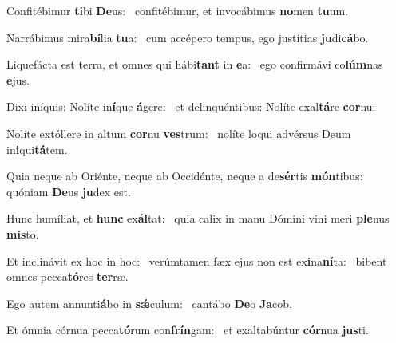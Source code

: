 \item Confitébimur \textbf{ti}bi \textbf{De}us:~\psstar{} confitébimur, et invocábimus \textbf{no}men \textbf{tu}um.
\item Narrábimus mira\textbf{bí}lia \textbf{tu}a:~\psstar{} cum accépero tempus, ego justítias \textbf{ju}di\textbf{cá}bo.
\item Liquefácta est terra, et omnes qui hábi\textbf{tant} in \textbf{e}a:~\psstar{} ego confirmávi co\textbf{lúm}nas \textbf{e}jus.
\item Dixi iníquis: Nolíte in\textbf{í}que \textbf{á}gere:~\psstar{} et delinquéntibus: Nolíte exal\textbf{tá}re \textbf{cor}nu:
\item Nolíte extóllere in altum \textbf{cor}nu \textbf{ves}trum:~\psstar{} nolíte loqui advérsus Deum in\textbf{i}qui\textbf{tá}tem.
\item Quia neque ab Oriénte, neque ab Occidénte, neque a de\textbf{sér}tis \textbf{món}tibus:~\psstar{} quóniam \textbf{De}us \textbf{ju}dex est.
\item Hunc humíliat, et \textbf{hunc} ex\textbf{ál}tat:~\psstar{} quia calix in manu Dómini vini meri \textbf{ple}nus \textbf{mis}to.
\item Et inclinávit ex hoc in hoc:~\pscross{} verúmtamen fæx ejus non est ex\textbf{i}na\textbf{ní}ta:~\psstar{} bibent omnes pecca\textbf{tó}res \textbf{ter}ræ.
\item Ego autem annunti\textbf{á}bo in \textbf{sǽ}culum:~\psstar{} cantábo \textbf{De}o \textbf{Ja}cob.
\item Et ómnia córnua pecca\textbf{tó}rum con\textbf{frín}gam:~\psstar{} et exaltabúntur \textbf{cór}nua \textbf{jus}ti.
